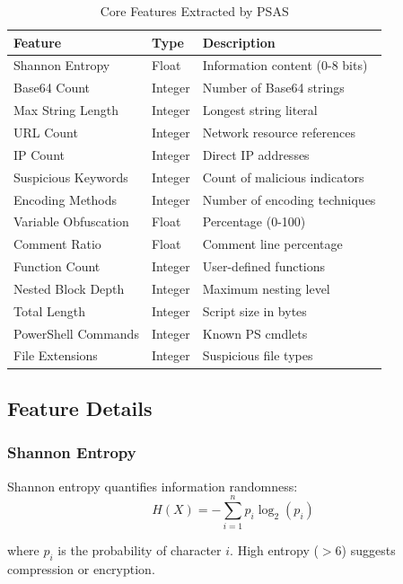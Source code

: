 \documentclass[10pt,conference,a4paper]{IEEEtran}
\begin{document}
\begin{table}[H]
\centering
\small
\begin{tabular}{|l|l|l|}
\hline
\textbf{Feature} & \textbf{Type} & \textbf{Description} \\
\hline
Shannon Entropy & Float & Information content (0-8 bits) \\
Base64 Count & Integer & Number of Base64 strings \\
Max String Length & Integer & Longest string literal \\
URL Count & Integer & Network resource references \\
IP Count & Integer & Direct IP addresses \\
Suspicious Keywords & Integer & Count of malicious indicators \\
Encoding Methods & Integer & Number of encoding techniques \\
Variable Obfuscation & Float & Percentage (0-100) \\
Comment Ratio & Float & Comment line percentage \\
Function Count & Integer & User-defined functions \\
Nested Block Depth & Integer & Maximum nesting level \\
Total Length & Integer & Script size in bytes \\
PowerShell Commands & Integer & Known PS cmdlets \\
File Extensions & Integer & Suspicious file types \\
\hline
\end{tabular}
\caption{Core Features Extracted by PSAS}
\label{tab:features}
\end{table}

\subsection{Feature Details}

\subsubsection{Shannon Entropy}

Shannon entropy quantifies information randomness:
\begin{equation}
H(X) = -\sum_{i=1}^{n} p_i \log_2(p_i)
\label{eq:entropy}
\end{equation}

where $p_i$ is the probability of character $i$. High entropy ($> 6$) suggests compression or encryption.
\end{document}
